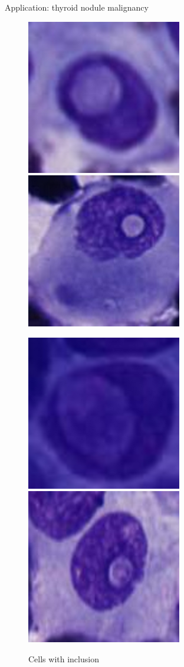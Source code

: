 \documentclass{beamer}
\begin{document}
\begin{frame}{Application: thyroid nodule malignancy}
	\begin{figure}
		\includegraphics[scale=0.3]{images/incl1.png}
		\hspace{1cm}
		\includegraphics[scale=0.3]{images/incl2.png}
	\end{figure}
	\begin{figure}
		\includegraphics[scale=0.3]{images/incl3.png}
		\hspace{1cm}		
		\includegraphics[scale=0.3]{images/incl4.png}
		\caption{Cells with inclusion}
	\end{figure}
\end{frame}
\end{document}
